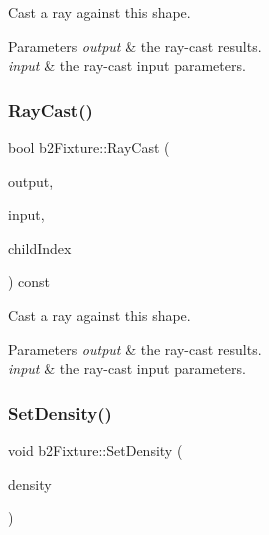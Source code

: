 Cast a ray against this shape. 
\begin{DoxyParams}{Parameters}
{\em output} & the ray-\/cast results. \\
\hline
{\em input} & the ray-\/cast input parameters. \\
\hline
\end{DoxyParams}
\mbox{\label{classb2Fixture_aaaafd69aa3e1a922acc4b9d7fb49170a}} 
\subsubsection{\texorpdfstring{Ray\+Cast()}{RayCast()}\hspace{0.1cm}{\footnotesize\ttfamily [2/2]}}
{\footnotesize\ttfamily bool b2\+Fixture\+::\+Ray\+Cast (\begin{DoxyParamCaption}\item[{\hyperlink{structb2RayCastOutput}{b2\+Ray\+Cast\+Output} $\ast$}]{output,  }\item[{const \hyperlink{structb2RayCastInput}{b2\+Ray\+Cast\+Input} \&}]{input,  }\item[{int32}]{child\+Index }\end{DoxyParamCaption}) const\hspace{0.3cm}{\ttfamily [inline]}}

Cast a ray against this shape. 
\begin{DoxyParams}{Parameters}
{\em output} & the ray-\/cast results. \\
\hline
{\em input} & the ray-\/cast input parameters. \\
\hline
\end{DoxyParams}
\mbox{\label{classb2Fixture_ad4e1d9323103975c8931d022b952d04a}} 
\subsubsection{\texorpdfstring{Set\+Density()}{SetDensity()}\hspace{0.1cm}{\footnotesize\ttfamily [1/2]}}
{\footnotesize\ttfamily void b2\+Fixture\+::\+Set\+Density (\begin{DoxyParamCaption}\item[{float32}]{density }\end{DoxyParamCaption})\hspace{0.3cm}{\ttfamily [inline]}}

